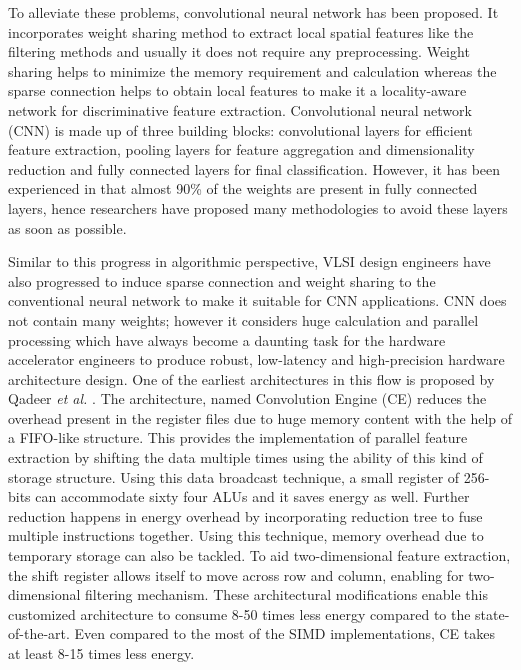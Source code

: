 \documentclass[journal]{IEEEtran}
\begin{document}
\par To alleviate these problems, convolutional neural network has been proposed. It incorporates weight sharing method to extract local spatial features like the filtering methods and usually it does not require any preprocessing. Weight sharing helps to minimize the memory requirement and calculation whereas the sparse connection helps to obtain local features to make it a locality-aware network for discriminative feature extraction. Convolutional neural network (CNN) is made up of three building blocks: convolutional layers for efficient feature extraction, pooling layers for feature aggregation and dimensionality reduction and fully connected layers for final classification. However, it has been experienced in \cite{paper6} that almost 90\% of the weights are present in fully connected layers, hence researchers have proposed many methodologies to avoid these layers as soon as possible.

\par Similar to this progress in algorithmic perspective, VLSI design engineers have also progressed to induce sparse connection and weight sharing to the conventional neural network to make it suitable for CNN applications. CNN does not contain many weights; however it considers huge calculation and parallel processing which have always become a daunting task for the hardware accelerator engineers to produce robust, low-latency and high-precision hardware architecture design. One of the earliest architectures in this flow is proposed by Qadeer \textit{et al.} \cite{paper20}. The architecture, named Convolution Engine (CE) reduces the overhead present in the register files due to huge memory content with the help of a FIFO-like structure. This provides the implementation of parallel feature extraction by shifting the data multiple times using the ability of this kind of storage structure. Using this data broadcast technique, a small register of 256-bits can accommodate sixty four ALUs and it saves energy as well. Further reduction happens in energy overhead by incorporating reduction tree to fuse multiple instructions together. Using this technique, memory overhead due to temporary storage can also be tackled. To aid two-dimensional feature extraction, the shift register allows itself to move across row and column, enabling for two-dimensional filtering mechanism. These architectural modifications enable this customized architecture to consume 8-50 times less energy compared to the state-of-the-art. Even compared to the most of the SIMD implementations, CE takes at least 8-15 times less energy.
\end{document}

